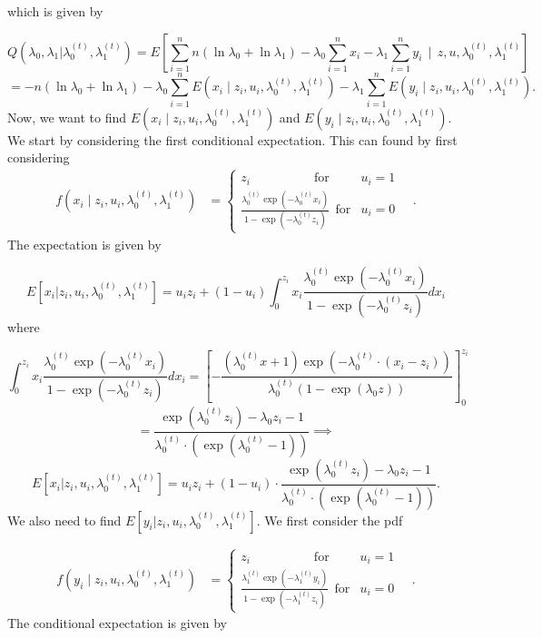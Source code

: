 \documentclass[
]{article}
\begin{document}
which is given by

\[
Q(\lambda_0, \lambda_1 | \lambda_0^{(t)}, \lambda_1^{(t)})=E \left[\sum_{i=1}^{n}n(\ln \lambda_0+ \ln \lambda_1)-\lambda_0\sum_{i=1}^n x_i -\lambda_1\sum_{i=1}^n y_i \ \ | \ \ z,u,\lambda_0^{(t)}, \lambda_1^{(t)} \right]
\]
\[
=-n(\ln\lambda_0+\ln\lambda_1) -\lambda_0\sum_{i=1}^n E(x_i\mid z_i,u_i,\lambda_0^{(t)},\lambda_1^{(t)}) -\lambda_1\sum_{i=1}^n E(y_i\mid z_i,u_i,\lambda_0^{(t)},\lambda_1^{(t)}).
\]
Now, we want to find \(E(x_i\mid z_i,u_i,\lambda_0^{(t)},\lambda_1^{(t)})\) and \(E(y_i\mid z_i,u_i,\lambda_0^{(t)},\lambda_1^{(t)}).\) We start by considering the first conditional expectation. This can found by first considering
\[
\begin{aligned}
  f(x_i\mid z_i,u_i,\lambda_0^{(t)},\lambda_1^{(t)})  
  &= \begin{cases} z_i \quad \quad \quad \quad \quad \text{for} & u_i=1 \\ \frac{\lambda_0^{(t)}\exp(-\lambda_0^{(t)}x_i)}{1-\exp(-\lambda_0^{(t)}z_i)} \ \ \text{for} & u_i=0 \end{cases} \quad.
\end{aligned}
\]
The expectation is given by

\[
E[x_i|z_i, u_i, \lambda_0^{(t)}, \lambda_1^{(t)}]=u_i z_i + (1-u_i)\int_{0}^{z_i} x_i \frac{\lambda_0^{(t)}\exp(-\lambda_0^{(t)}x_i)}{1-\exp(-\lambda_0^{(t)}z_i)} dx_i
\]
where

\[
\int_{0}^{z_i} x_i \frac{\lambda_0^{(t)}\exp(-\lambda_0^{(t)}x_i)}{1-\exp(-\lambda_0^{(t)}z_i)} dx_i=
\left [- \frac{(\lambda_0^{(t)}x+1)\exp(-\lambda_0^{(t)} \cdot (x_i-z_i))}{\lambda_0^{(t)}(1-\exp(\lambda_0 z))} \right]_{0}^{z_i}
\]
\[
=\frac{\exp(\lambda_0^{(t)} z_i)- \lambda_0 z_i-1}{\lambda_0^{(t)} \cdot (\exp(\lambda_0^{(t)}-1))} \implies
\]
\[
E[x_i|z_i, u_i, \lambda_0^{(t)}, \lambda_1^{(t)}]=u_i z_i+(1-u_i) \cdot \frac{\exp(\lambda_0^{(t)} z_i)- \lambda_0 z_i-1}{\lambda_0^{(t)} \cdot (\exp(\lambda_0^{(t)}-1))}.
\]
We also need to find \(E[y_i|z_i, u_i, \lambda_0^{(t)}, \lambda_1^{(t)}]\). We first consider the pdf

\[
\begin{aligned}
  f(y_i\mid z_i,u_i,\lambda_0^{(t)},\lambda_1^{(t)})  
  &= \begin{cases} z_i \quad \quad \quad \quad \quad \text{for} & u_i=1 \\ \frac{\lambda_1^{(t)}\exp(-\lambda_1^{(t)}y_i)}{1-\exp(-\lambda_1^{(t)}z_i)} \ \ \text{for} & u_i=0 \end{cases} \quad.
\end{aligned}
\]
The conditional expectation is given by
\end{document}
